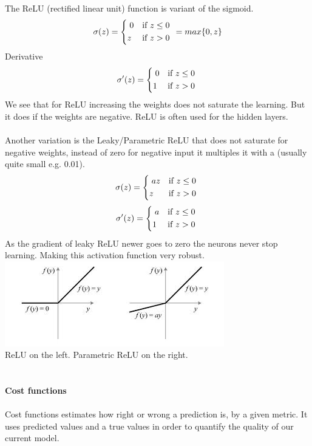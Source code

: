 \documentclass[12pt, letterpaper, twoside]{article}
\begin{document}
\ \\
\ \\
The ReLU (rectified linear unit) function is variant of the sigmoid.\\
\[
    \sigma(z) =
    \begin{dcases*}
  		\; 0 & if $z \leq 0 $ \\
  		z & if $z > 0$
	\end{dcases*}
	= max\{0, z\}
\]
Derivative\\
\[
    \sigma'(z) =
    \begin{dcases*}
  		\; 0 & if $z \leq 0 $ \\
  		1 & if $z > 0$
	\end{dcases*}
\]
We see that for ReLU increasing the weights does not saturate the learning. But it does if the weights are negative. ReLU is often used for the hidden layers.\\
\ \\
Another variation is the Leaky/Parametric ReLU that does not saturate for negative weights, instead of zero for negative input it multiples it with a (usually quite small e.g. 0.01).\\
\[
    \sigma(z) =
    \begin{dcases*}
  		\; az & if $z \leq 0 $ \\
  		z & if $z > 0$
	\end{dcases*}
\]
\[
    \sigma'(z) =
    \begin{dcases*}
  		\; a & if $z \leq 0 $ \\
  		1 & if $z > 0$
	\end{dcases*}
\]
As the gradient of leaky ReLU newer goes to zero the neurons never stop learning. Making this activation function very robust.\\
\includegraphics[scale=1]{"ReLU"}\\
ReLU on the left. Parametric ReLU on the right.\\
\ \\
\ \\
\textbf{Cost functions}\\
\ \\
Cost functions estimates how right or wrong a prediction is, by a given metric. It uses predicted values and a true values in order to quantify the quality of our current model. 
\end{document}
